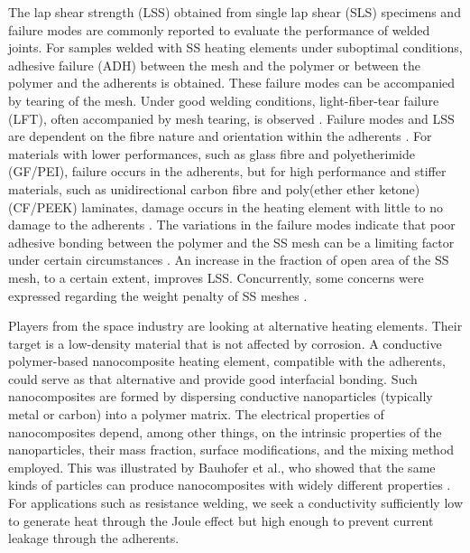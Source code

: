The lap shear strength (LSS) obtained from single lap shear (SLS) specimens and failure modes are commonly reported to evaluate the performance of welded joints. 
For samples welded with SS heating elements under suboptimal conditions, adhesive failure (ADH) between the mesh and the polymer or between the polymer and the adherents is obtained. 
These failure modes can be accompanied by tearing of the mesh. 
Under good welding conditions, light-fiber-tear failure (LFT), often accompanied by mesh tearing, is observed \cite{Shi2014}. 
Failure modes and LSS are dependent on the fibre nature and orientation within the adherents \cite{Shi2013a}. 
For materials with lower performances, such as glass fibre and polyetherimide (GF/PEI), failure occurs in the adherents, but for high performance and stiffer materials, such as unidirectional carbon fibre and poly(ether ether ketone) (CF/PEEK) laminates, damage occurs in the heating element with little to no damage to the adherents \cite{Dube2015}. 
The variations in the failure modes indicate that poor adhesive bonding between the polymer and the SS mesh can be a limiting factor under certain circumstances \cite{Dube2007,Dube2012a,Dube2009a,Shi2014,Shi2015a}. 
An increase in the fraction of open area of the SS mesh, to a certain extent, improves LSS. 
Concurrently, some concerns were expressed regarding the weight penalty of SS meshes \cite{Stavrov2005a}. 

Players from the space industry are looking at alternative heating elements.  
Their target is a low-density material that is not affected by corrosion. 
A conductive polymer-based nanocomposite heating element, compatible with the adherents, could serve as that alternative and provide good interfacial bonding. 
Such nanocomposites are formed by dispersing conductive nanoparticles (typically metal or carbon) into a polymer matrix. 
The electrical properties of nanocomposites depend, among other things, on the intrinsic properties of the nanoparticles, their mass fraction, surface modifications, and the mixing method employed. 
This was illustrated by Bauhofer et al., who showed that the same kinds of particles can produce nanocomposites with widely different properties \cite{Bauhofer2009}. 
For applications such as resistance welding, we seek a conductivity sufficiently low to generate heat through the Joule effect but high enough to prevent current leakage through the adherents. 

